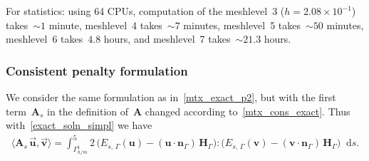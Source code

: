 \documentclass[12pt]{article}
\newcommand{\vect}[1]{\boldsymbol{\mathbf{#1}}}
\newcommand*\diff{\mathop{}\!\mathrm{d}}
\begin{document}
For statistics: using 64 CPUs, computation of the meshlevel~3 ($h = 2.08\times10^{-1}$) takes~${\sim}1$ minute, meshlevel~4 takes~${\sim}7$ minutes, meshlevel~5 takes~${\sim}50$ minutes, meshlevel~6 takes~$4.8$ hours, and meshlevel~7 takes~${\sim}21.3$ hours.

\subsubsection{Consistent penalty formulation}

%
%
We consider the same formulation as in~\eqref{mtx_exact_p2}, but with the first term~$\vect A_s$ in the definition of~$\vect A$ changed according to~\eqref{mtx_cons_exact}. Thus with~\eqref{exact_soln_simpl} we have
\begin{align}\label{mtx_exact_p2_cons}
	\langle \vect A_s\,\vec{\vect u}, \vec{\vect v} \rangle = \int^5_{\Gamma_{h/m}^1} 2\,\big( E_{s,\,\Gamma}(\vect u) - (\vect u\cdot\vect n_{\Gamma})\,\vect H_{\Gamma} \big) : \big( E_{s,\,\Gamma}(\vect v) - (\vect v\cdot\vect n_{\Gamma})\,\vect H_{\Gamma} \big) \diff{s}.
\end{align}
\end{document}
